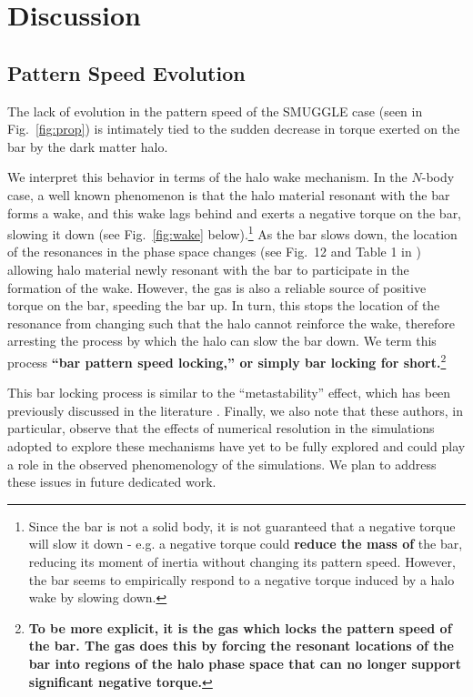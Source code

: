 \documentclass[twocolumn,linenumbers,trackchanges]{aastex631}
\newcommand{\Nbody}{$N$-body}
\newcommand{\SMUGGLE}{SMUGGLE}
\begin{document}
\section{Discussion}
\label{sec:discussion}
\subsection{Pattern Speed Evolution}
The lack of evolution in the pattern speed of the \SMUGGLE{} case (seen in
Fig.~\ref{fig:prop}) is intimately tied to the sudden decrease in torque exerted
on the bar by the dark matter halo. 

We interpret this behavior in terms of the halo wake mechanism. In the
\Nbody{} case, a well known phenomenon is that the halo material resonant with
the bar forms a wake, and this wake lags behind \citep{1984MNRAS.209..729T,
1985MNRAS.213..451W, 1992ApJ...400...80H} and exerts a negative torque on the
bar, slowing it down (see Fig.~\ref{fig:wake} below).\footnote{Since the bar is not a solid
body, it is not guaranteed that a negative torque will slow it down - e.g. a
negative torque could {\bf reduce the mass of} the bar, reducing its moment of inertia without
changing its pattern speed. However, the bar seems to empirically respond to a
negative torque induced by a halo wake by slowing down.} As the bar slows down,
the location of the resonances in the phase space changes (see Fig.~12 and Table
1 in \citet{2020ApJ...890..117D}) allowing halo material newly resonant with the
bar to participate in the formation of the wake. However, the gas is also a
reliable source of positive torque on the bar, speeding the bar up. In turn,
this stops the location of the resonance from changing such that the halo cannot
reinforce the wake, therefore arresting the process by which the halo can slow
the bar down. We term this process {\bf ``bar pattern speed locking,'' or simply
bar locking for short.}\footnote{{\bf To be more explicit, it is the gas which locks 
the pattern speed of the bar. The gas does this by forcing the resonant locations 
of the bar into regions of the halo phase space that can no longer support 
significant negative torque.}} 

This bar locking process is similar to the ``metastability'' effect, which has
been previously discussed in the literature \citep{2003MNRAS.345..406V,
2006ApJ...639..868S}. Finally, we also note that these authors, in particular,
observe that the effects of numerical resolution in the simulations adopted to
explore these mechanisms have yet to be fully explored and could play a role in
the observed phenomenology of the simulations. We plan to address these issues
in future dedicated work.
\end{document}

